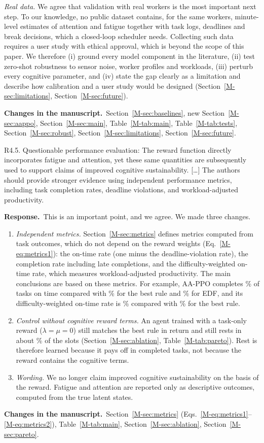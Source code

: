 \documentclass[11pt]{article}
\newcommand{\resp}{\par\smallskip\noindent\textbf{Response.}~}
\newcommand{\change}{\par\smallskip\noindent\textbf{Changes in the manuscript.}~}
\newcommand{\Sec}[1]{Section~\ref{M-#1}}
\newcommand{\Eq}[1]{Eq.~\eqref{M-#1}}
\newcommand{\Tab}[1]{Table~\ref{M-#1}}
\begin{document}
\emph{Real data.} We agree that validation with real workers is the most important next step. To our knowledge, no public dataset contains, for the same workers, minute-level estimates of attention and fatigue together with task logs, deadlines and break decisions, which a closed-loop scheduler needs. Collecting such data requires a user study with ethical approval, which is beyond the scope of this paper. We therefore (i) ground every model component in the literature, (ii) test zero-shot robustness to sensor noise, worker profiles and workloads, (iii) perturb every cognitive parameter, and (iv) state the gap clearly as a limitation and describe how calibration and a user study would be designed (\Sec{sec:limitations}, \Sec{sec:future}).
\change \Sec{sec:baselines}, new \Sec{sec:aappo}, \Sec{sec:main}, \Tab{tab:main}, \Tab{tab:tests}, \Sec{sec:robust}, \Sec{sec:limitations}, \Sec{sec:future}.

\begin{rcomment}{R4.5.}
Questionable performance evaluation: The reward function directly incorporates fatigue and attention, yet these same quantities are subsequently used to support claims of improved cognitive sustainability. [\dots] The authors should provide stronger evidence using independent performance metrics, including task completion rates, deadline violations, and workload-adjusted productivity.
\end{rcomment}
\resp This is an important point, and we agree. We made three changes.
\begin{enumerate}[label=(\roman*)]
\item \emph{Independent metrics.} \Sec{sec:metrics} defines metrics computed from task outcomes, which do not depend on the reward weights (\Eq{eq:metrics1}): the on-time rate (one minus the deadline-violation rate), the completion rate including late completions, and the difficulty-weighted on-time rate, which measures workload-adjusted productivity. The main conclusions are based on these metrics. For example, AA-PPO completes \PPOOnTimePct\% of tasks on time compared with \bestHeurOnTimePct\% for the best rule and \EDFOnTimePct\% for EDF, and its difficulty-weighted on-time rate is \PPOWOnTimePct\% compared with \SPTThresholdWOnTimePct\% for the best rule.
\item \emph{Control without cognitive reward terms.} An agent trained with a task-only reward ($\lambda=\mu=0$) still matches the best rule in return and still rests in about \parZeroBrkPct\% of the slots (\Sec{sec:ablation}, \Tab{tab:pareto}). Rest is therefore learned because it pays off in completed tasks, not because the reward contains the cognitive terms.
\item \emph{Wording.} We no longer claim improved cognitive sustainability on the basis of the reward. Fatigue and attention are reported only as descriptive outcomes, computed from the true latent states.
\end{enumerate}
\change \Sec{sec:metrics} (Eqs.~\eqref{M-eq:metrics1}--\eqref{M-eq:metrics2}), \Tab{tab:main}, \Sec{sec:ablation}, \Sec{sec:pareto}.
\end{document}
